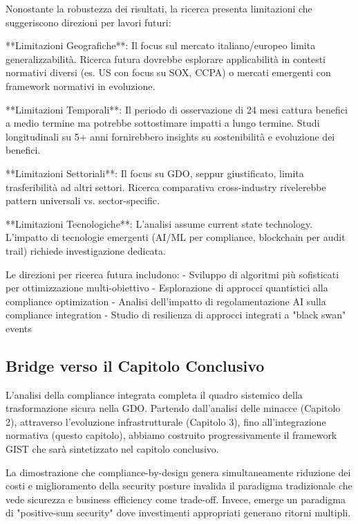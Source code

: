 Nonostante la robustezza dei risultati, la ricerca presenta limitazioni che suggeriscono direzioni per lavori futuri:

**Limitazioni Geografiche**: Il focus sul mercato italiano/europeo limita generalizzabilità. Ricerca futura dovrebbe esplorare applicabilità in contesti normativi diversi (es. US con focus su SOX, CCPA) o mercati emergenti con framework normativi in evoluzione.

**Limitazioni Temporali**: Il periodo di osservazione di 24 mesi cattura benefici a medio termine ma potrebbe sottostimare impatti a lungo termine. Studi longitudinali su 5+ anni fornirebbero insights su sostenibilità e evoluzione dei benefici.

**Limitazioni Settoriali**: Il focus su GDO, seppur giustificato, limita trasferibilità ad altri settori. Ricerca comparativa cross-industry rivelerebbe pattern universali vs. sector-specific.

**Limitazioni Tecnologiche**: L'analisi assume current state technology. L'impatto di tecnologie emergenti (AI/ML per compliance, blockchain per audit trail) richiede investigazione dedicata.

Le direzioni per ricerca futura includono:
- Sviluppo di algoritmi più sofisticati per ottimizzazione multi-obiettivo
- Esplorazione di approcci quantistici alla compliance optimization
- Analisi dell'impatto di regolamentazione AI sulla compliance integration
- Studio di resilienza di approcci integrati a "black swan" events

\subsection{Bridge verso il Capitolo Conclusivo}

L'analisi della compliance integrata completa il quadro sistemico della trasformazione sicura nella GDO. Partendo dall'analisi delle minacce (Capitolo 2), attraverso l'evoluzione infrastrutturale (Capitolo 3), fino all'integrazione normativa (questo capitolo), abbiamo costruito progressivamente il framework GIST che sarà sintetizzato nel capitolo conclusivo.

La dimostrazione che compliance-by-design genera simultaneamente riduzione dei costi e miglioramento della security posture invalida il paradigma tradizionale che vede sicurezza e business efficiency come trade-off. Invece, emerge un paradigma di "positive-sum security" dove investimenti appropriati generano ritorni multipli.

